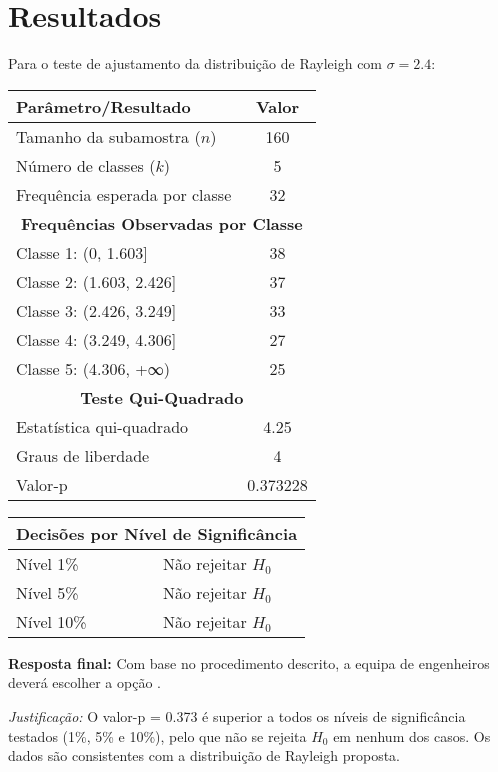 \documentclass[11pt,a4paper]{article}
\begin{document}
\section*{Resultados}

\begin{tcolorbox}[colback=green!5!white,colframe=green!75!black,title=Solução]
Para o teste de ajustamento da distribuição de Rayleigh com \( \sigma = 2.4 \):

\begin{center}
\begin{tabular}{|l|c|}
\hline
\textbf{Parâmetro/Resultado} & \textbf{Valor} \\
\hline
Tamanho da subamostra (\( n \)) & 160 \\
Número de classes (\( k \)) & 5 \\
Frequência esperada por classe & 32 \\
\hline
\multicolumn{2}{|c|}{\textbf{Frequências Observadas por Classe}} \\
\hline
Classe 1: (0, 1.603] & 38 \\
Classe 2: (1.603, 2.426] & 37 \\
Classe 3: (2.426, 3.249] & 33 \\
Classe 4: (3.249, 4.306] & 27 \\
Classe 5: (4.306, +∞) & 25 \\
\hline
\multicolumn{2}{|c|}{\textbf{Teste Qui-Quadrado}} \\
\hline
Estatística qui-quadrado & 4.25 \\
Graus de liberdade & 4 \\
Valor-p & 0.373228 \\
\hline
\end{tabular}
\end{center}

\begin{center}
\begin{tabular}{|l|c|}
\hline
\multicolumn{2}{|c|}{\textbf{Decisões por Nível de Significância}} \\
\hline
Nível 1\% & Não rejeitar \( H_0 \) \\
Nível 5\% & Não rejeitar \( H_0 \) \\
Nível 10\% & Não rejeitar \( H_0 \) \\
\hline
\end{tabular}
\end{center}

\vspace{0.5cm}
\textbf{Resposta final:} Com base no procedimento descrito, a equipa de engenheiros deverá escolher a opção .

\vspace{0.3cm}
\textit{Justificação:} O valor-p = 0.373 é superior a todos os níveis de significância testados (1\%, 5\% e 10\%), pelo que não se rejeita \( H_0 \) em nenhum dos casos. Os dados são consistentes com a distribuição de Rayleigh proposta.
\end{tcolorbox}
\end{document}
